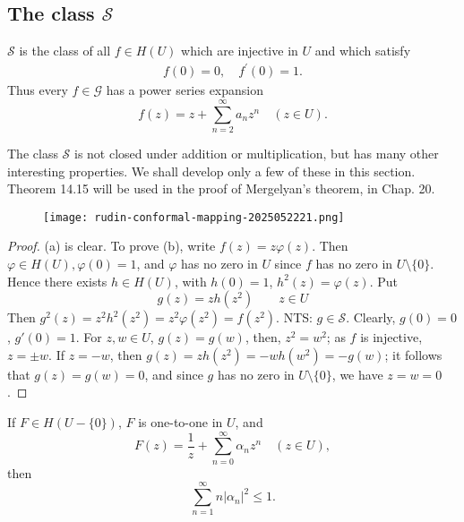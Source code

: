 \subsection{The class \texorpdfstring{$\mathscr{S}$}{mathscrS}}

\begin{definition}
$\mathscr{S}$ is the class of all $f \in H(U)$ which are injective in $U$ and which satisfy
\[
\begin{gathered}
f(0)=0, \quad f^{\prime}(0)=1 .
\end{gathered}
\]Thus every $f \in \mathscr{G}$ has a power series expansion
\[
f(z)=z+\sum_{n=2}^{\infty} a_n z^n \quad(z \in U) .
\]
\end{definition}
The class $\mathscr{S}$ is not closed under addition or multiplication, but has many other interesting properties. We shall develop only a few of these in this section. Theorem 14.15 will be used in the proof of Mergelyan's theorem, in Chap. 20.

\begin{figure}[H]
\centering
\texttt{[image: rudin-conformal-mapping-2025052221.png]}
\label{}
\end{figure}

\begin{proof}
(a) is clear. To prove (b), write $f(z)=z\varphi(z)$. Then $\varphi\in H(U),\varphi(0)=1$, and $\varphi$ has no zero in $U$ since $f$ has no zero in $U\setminus \{ 0 \}$. Hence there exists $h\in H(U)$, with $h(0)=1$, $h^2(z)=\varphi(z)$. Put
\[
g(z)=zh(z^2)\qquad z\in U
\]
Then $g^2(z)=z^2h^2(z^2)=z^2\varphi(z^2)=f(z^2)$. NTS: $g\in \mathscr{S}$. Clearly, $g(0)=0$, $g'(0)=1$. For $z, w\in U$, $g(z)=g(w)$, then, $z^2=w^2$; as $f$ is injective, $z=\pm w$. If $z=-w$, then $g(z)=zh(z^2)=-wh(w^2)=-g(w)$; it follows that $g(z)=g(w)=0$, and since $g$ has no zero in $U\setminus \{ 0 \}$, we have $z=w=0$.
\end{proof}

\begin{theorem}
If $F \in H(U-\{0\})$, $F$ is one-to-one in $U$, and
\[
F(z)=\frac{1}{z}+\sum_{n=0}^{\infty} \alpha_n z^n \quad(z \in U),
\]then
\begin{equation}
\sum_{n=1}^{\infty} n\left|\alpha_n\right|^2 \leq 1 .
\label{1a9dd9}
\end{equation}
\end{theorem}

